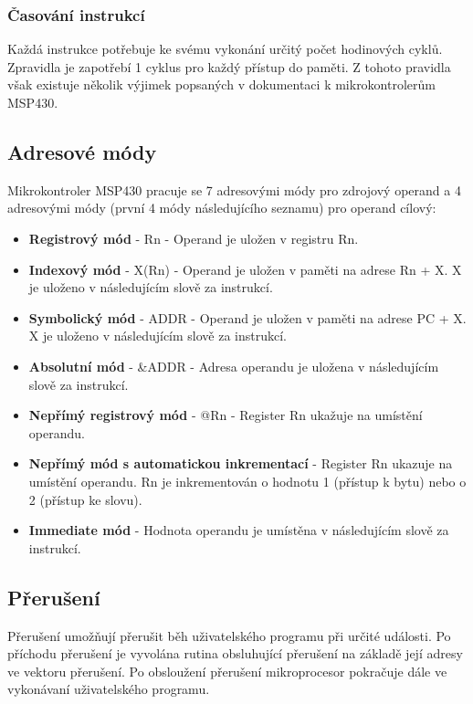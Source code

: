 \subsubsection{Časování instrukcí}

Každá instrukce potřebuje ke svému vykonání určitý počet hodinových cyklů. Zpravidla je zapotřebí 1 cyklus pro každý přístup do paměti. Z tohoto pravidla však existuje několik výjimek popsaných v dokumentaci k mikrokontrolerům MSP430.
 
\subsection{Adresové módy}

Mikrokontroler MSP430 pracuje se 7 adresovými módy pro zdrojový operand a 4 adresovými módy (první 4 módy následujícího seznamu) pro operand cílový:

\begin{itemize}
\item \textbf{Registrový mód} - Rn - Operand je uložen v registru Rn.
\item \textbf{Indexový mód} - X(Rn) - Operand je uložen v paměti na adrese Rn + X. X je uloženo v následujícím slově za instrukcí.
\item \textbf{Symbolický mód} - ADDR - Operand je uložen v paměti na adrese PC + X. X je uloženo v následujícím slově za instrukcí.
\item \textbf{Absolutní mód} - \&ADDR - Adresa operandu je uložena v následujícím slově za instrukcí.
\item \textbf{Nepřímý registrový mód} - @Rn - Register Rn ukažuje na umístění operandu.
\item \textbf{Nepřímý mód s automatickou inkrementací} - Register Rn ukazuje na umístění operandu. Rn je inkrementován o hodnotu 1 (přístup k bytu) nebo o 2 (přístup ke slovu).
\item \textbf{Immediate mód} - Hodnota operandu je umístěna v následujícím slově za instrukcí.
\end{itemize}

\subsection{Přerušení}

Přerušení umožňují přerušit běh uživatelského programu při určité události. Po příchodu přerušení je vyvolána rutina obsluhující přerušení na základě její adresy ve vektoru přerušení. Po obsloužení přerušení mikroprocesor pokračuje dále ve vykonávaní uživatelského programu.

